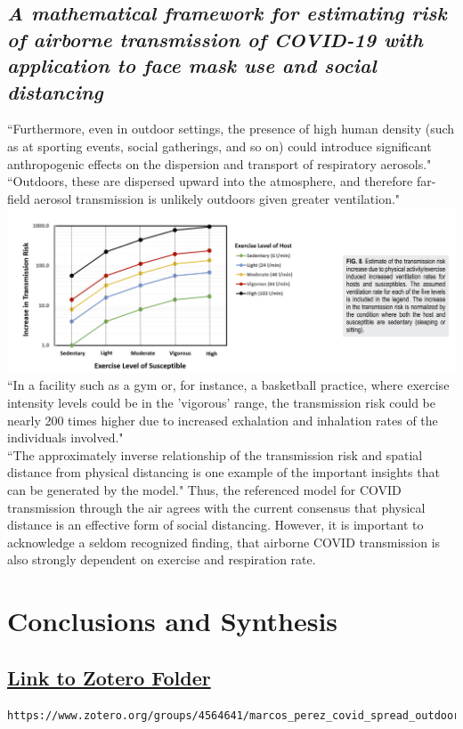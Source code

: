\documentclass[12pt]{article}
\begin{document}
\subsection{\textit{A mathematical framework for estimating
risk of airborne transmission of COVID-19
with application to face mask use and
social distancing} \cite{noauthor_mathematical_nodate}}
“Furthermore, even in outdoor settings, the presence
of high human density (such as at sporting events, social gatherings,
and so on) could introduce significant anthropogenic effects on the
dispersion and transport of respiratory aerosols."
“Outdoors, these are dispersed upward into the
atmosphere, and therefore far-field aerosol transmission is
unlikely outdoors given greater ventilation."\\
\includegraphics[scale=.6]{Images/Figure Screenshots/Estimate of the transmission risk.PNG}\\
“In a facility such as a gym or, for instance,
a basketball practice, where exercise intensity levels could be in the
'vigorous' range, the transmission risk could be nearly 200 times
higher due to increased exhalation and inhalation rates of the individuals involved."\\
“The approximately inverse relationship of the transmission risk and spatial distance from physical distancing is one example of the important insights that can be generated by the model." Thus, the referenced model for COVID transmission through the air agrees with the current consensus that physical distance is an effective form of social distancing. However, it is important to acknowledge a seldom recognized finding, that airborne COVID transmission is also strongly dependent on exercise and respiration rate.\cite{noauthor_mathematical_nodate}
\section{Conclusions and Synthesis}
\subsection{\href{https://www.zotero.org/groups/4564641/marcos\_perez\_covid\_spread\_outdoors/library}{Link to Zotero Folder}}
\begin{verbatim}
https://www.zotero.org/groups/4564641/marcos_perez_covid_spread_outdoors/library
\end{verbatim}


\printbibliography[title = \Large \textbf{References} \Large ]
\end{document}
